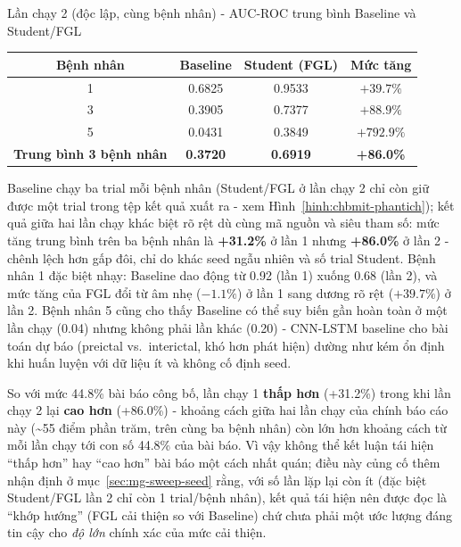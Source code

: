 \begin{table}[H]{Lần chạy 2 (độc lập, cùng bệnh nhân) - AUC-ROC trung bình Baseline và Student/FGL}
	\label{bang:chbmit-sosanh-benhnhan-l2}
	\centering
	\begin{tabular}{cccc}
		\toprule
		\textbf{Bệnh nhân} & \textbf{Baseline} & \textbf{Student (FGL)} & \textbf{Mức tăng} \\
		\midrule
		1 & 0.6825 & 0.9533 & $+39.7\%$ \\
		3 & 0.3905 & 0.7377 & $+88.9\%$ \\
		5 & 0.0431 & 0.3849 & $+792.9\%$\footnotemark \\
		\midrule
		\textbf{Trung bình 3 bệnh nhân} & \textbf{0.3720} & \textbf{0.6919} & \textbf{+86.0\%} \\
		\bottomrule
	\end{tabular}
\end{table}

Baseline chạy ba trial mỗi bệnh nhân (Student/FGL ở lần chạy 2 chỉ còn giữ được một trial trong
tệp kết quả xuất ra - xem Hình~\ref{hinh:chbmit-phantich}); kết quả giữa hai lần chạy khác biệt
rõ rệt dù cùng mã nguồn và siêu tham số: mức tăng trung bình trên ba bệnh nhân là \textbf{+31.2\%}
ở lần 1 nhưng \textbf{+86.0\%} ở lần 2 - chênh lệch hơn gấp đôi, chỉ do khác seed ngẫu nhiên và
số trial Student. Bệnh nhân 1 đặc biệt nhạy: Baseline dao động từ 0.92 (lần 1) xuống 0.68 (lần
2), và mức tăng của FGL đổi từ âm nhẹ ($-1.1\%$) ở lần 1 sang dương rõ rệt ($+39.7\%$) ở lần 2.
Bệnh nhân 5 cũng cho thấy Baseline có thể suy biến gần hoàn toàn ở một lần chạy (0.04) nhưng
không phải lần khác (0.20) - CNN-LSTM baseline cho bài toán dự báo (preictal vs.\ interictal, khó
hơn phát hiện) dường như kém ổn định khi huấn luyện với dữ liệu ít và không cố định seed.

So với mức 44.8\% bài báo công bố, lần chạy 1 \textbf{thấp hơn} (+31.2\%) trong khi lần chạy 2
lại \textbf{cao hơn} (+86.0\%) - khoảng cách giữa hai lần chạy của chính báo cáo này
(\textasciitilde55 điểm phần trăm, trên cùng ba bệnh nhân) còn lớn hơn khoảng cách từ mỗi lần
chạy tới con số 44.8\% của bài báo. Vì vậy không thể kết luận tái hiện ``thấp hơn'' hay ``cao
hơn'' bài báo một cách nhất quán; điều này củng cố thêm nhận định ở mục~\ref{sec:mg-sweep-seed}
rằng, với số lần lặp lại còn ít (đặc biệt Student/FGL lần 2 chỉ còn 1 trial/bệnh nhân), kết quả
tái hiện nên được đọc là ``khớp hướng'' (FGL cải thiện so với Baseline) chứ chưa phải một ước
lượng đáng tin cậy cho \textit{độ lớn} chính xác của mức cải thiện.

